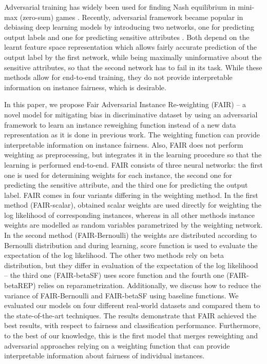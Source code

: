 \documentclass[preprint,12pt]{elsarticle}
\begin{document}
Adversarial training has widely been used for finding Nash equilibrium in mini-max (zero-sum) games \cite{goodfellow2014generative, nouiehed2019solving, hsieh2019finding}. Recently, adversarial framework became popular in debiasing deep learning models by introducing two networks, one for predicting output labels and one for predicting sensitive attributes \cite{wadsworth2018achieving, madras2018learning, cevora2020fair, grari2020adversarial}. Both depend on the learnt feature space representation which allows fairly accurate prediction of the output label by the first network, while being maximally uninformative about the sensitive attributes, so that the second network has to fail in its task. While these methods allow for end-to-end training, they do not provide interpretable information on instance fairness, which is desirable.

In this paper, we propose Fair Adversarial Instance Re-weighting (FAIR) -- a novel model for mitigating bias in discriminative dataset by using an adversarial framework to learn an instance reweighing function instead of a new data representation as it is done in previous work. The weighting function can provide interpretable information on instance fairness. Also, FAIR does not perform weighting as preprocessing, but integrates it in the learning procedure so that the learning is performed end-to-end. FAIR consists of three neural networks: the first one is used for determining weights for each instance, the second one for predicting the sensitive attribute, and the third one for predicting the output label. FAIR comes in four variants differing in the weighting method. In the first method (FAIR-scalar), obtained scalar weights are used directly for weighting the log likelihood of corresponding instances, whereas in all other methods instance weights are modelled as random variables parametrized by the weighting network. In the second method (FAIR-Bernoulli) the weights are distributed according to Bernoulli distribution and during learning, score function is used to evaluate the expectation of the log likelihood. The other two methods rely on beta distribution, but they differ in evaluation of the expectation of the log likelihood -- the third one (FAIR-betaSF) uses score function and the fourth one (FAIR-betaREP) relies on reparametrization. Additionally, we discuss how to reduce the variance of FAIR-Bernoulli and FAIR-betaSF using baseline functions. We evaluated our models on four different real-world datasets and compared them to the state-of-the-art techniques. The results demonstrate that FAIR achieved the best results, with respect to fairness and classification performance. Furthermore, to the best of our knowledge, this is the first model that merges reweighting and adversarial approaches relying on a weighting function that can provide interpretable information about fairness of individual instances.
\end{document}
